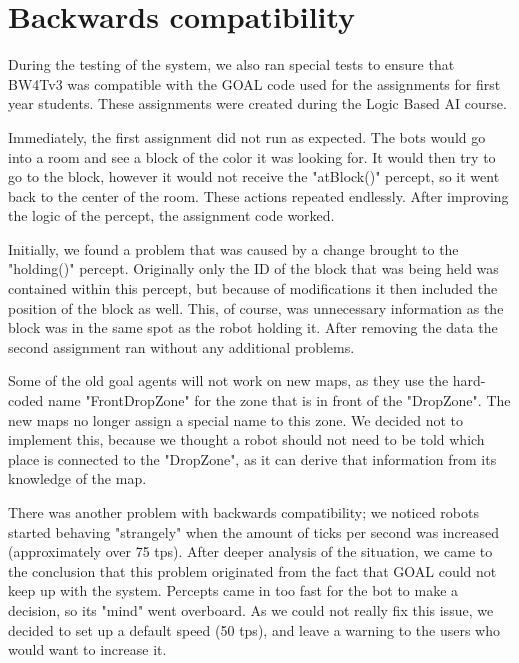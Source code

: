 \section{Backwards compatibility}
During the testing of the system, we also ran special tests to ensure that BW4Tv3 was compatible with the GOAL code used for the assignments for first year students. These assignments were created during the Logic Based AI course. 

Immediately, the first assignment did not run as expected. The bots would go into a room and see a block of the color it was looking for. It would then try to go to the block, however it would not receive the "atBlock()" percept, so it went back to the center of the room. These actions repeated endlessly. After improving the logic of the percept, the assignment code worked.

Initially, we found a problem that was caused by a change brought to the "holding()" percept. Originally only the ID of the block that was being held was contained within this percept, but because of modifications it then included the position of the block as well. This, of course, was unnecessary information as the block was in the same spot as the robot holding it. After removing the data the second assignment ran without any additional problems.

Some of the old goal agents will not work on new maps, as they use the hard-coded name "FrontDropZone" for the zone that is in front of the "DropZone". The new maps no longer assign a special name to this zone. We decided not to implement this, because we thought a robot should not need to be told which place is connected to the "DropZone", as it can derive that information from its knowledge of the map.

There was another problem with backwards compatibility; we noticed robots started behaving "strangely" when the amount of ticks per second was increased (approximately over 75 tps). After deeper analysis of the situation, we came to the conclusion that this problem originated from the fact that GOAL could not keep up with the system. Percepts came in too fast for the bot to make a decision, so its "mind" went overboard. As we could not really fix this issue, we decided to set up a default speed (50 tps), and leave a warning to the users who would want to increase it. 